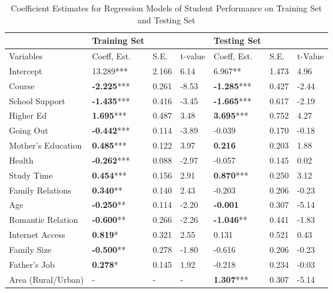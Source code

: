 \documentclass[sigconf]{acmart}
\begin{document}
\begin{table*}[ht]
  \caption{Coefficient Estimates for Regression Models of Student Performance on 
  Training Set and Testing Set}
  \label{tab:freq}
  \begin{tabular}{lllllll}
    \toprule
                        & Training Set      &        &         & Testing Set &         &          \\
    \midrule
    Variables           & Coeff, Est.        & S.E.  & t-value & Coeff, Est. & S.E. & t-Value  \\
    \midrule
    Intercept           &       13.289***    & 2.166 &  6.14  &          6.967**    & 1.473 &  4.96 \\
    Course              & \textbf{-2.225}*** & 0.261 & -8.53  & \textbf{-1.285}***  & 0.427 & -2.44 \\
    School Support      & \textbf{-1.435}*** & 0.416 & -3.45  & \textbf{-1.665}***  & 0.617 & -2.19 \\
    Higher Ed           & \textbf{ 1.695}*** & 0.487 &  3.48  & \textbf{ 3.695}***  & 0.752 &  4.27 \\
    Going Out           & \textbf{-0.442}*** & 0.114 & -3.89  &         -0.039      & 0.170 & -0.18 \\
    Mother's Education  & \textbf{ 0.485}*** & 0.122 &  3.97  & \textbf{ 0.216}    & 0.203 &  1.88 \\
    Health              & \textbf{-0.262}*** & 0.088 & -2.97  &         -0.057      & 0.145 &  0.02 \\
    Study Time          & \textbf{ 0.454}*** & 0.156 &  2.91  & \textbf{ 0.870}***  & 0.250 &  3.12 \\
    Family Relations    & \textbf{ 0.340}**  & 0.140 &  2.43  &         -0.203      & 0.206 & -0.23 \\
    Age                 & \textbf{-0.250}**  & 0.114 & -2.20  & \textbf{-0.001}     & 0.307 & -5.14 \\
    Romantic Relation   & \textbf{-0.600}**  & 0.266 & -2.26  & \textbf{-1.046}**   & 0.441 & -1.83 \\
    Internet Access     & \textbf{ 0.819}*   & 0.321 &  2.55  &          0.131      & 0.521 &  0.43 \\
    Family Size         & \textbf{-0.500}**  & 0.278 & -1.80  &         -0.616      & 0.206 & -0.23 \\
    Father's Job        & \textbf{ 0.278}*   & 0.145 &  1.92  &         -0.218      & 0.234 & -0.03 \\
    Area (Rural/Urban)  &           -        &  -    &  -     & \textbf{ 1.307}***  & 0.307 & -5.14 \\

\end{tabular}
\end{table*}
\end{document}
